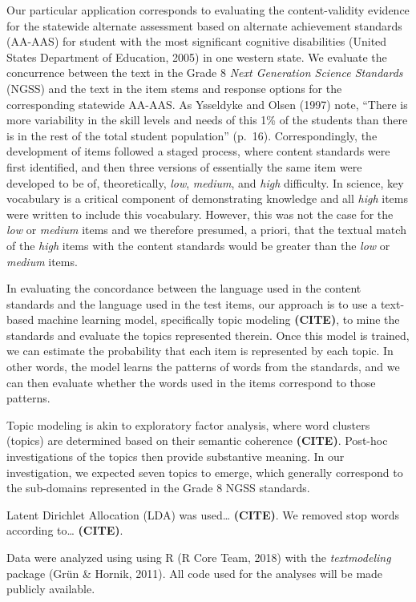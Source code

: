 \documentclass[doc]{apa6}
\theoremstyle{definition}
\theoremstyle{definition}
\theoremstyle{definition}
\theoremstyle{remark}
\begin{document}
Our particular application corresponds to evaluating the
content-validity evidence for the statewide alternate assessment based
on alternate achievement standards (AA-AAS) for student with the most
significant cognitive disabilities (United States Department of
Education, 2005) in one western state. We evaluate the concurrence
between the text in the Grade 8 \emph{Next Generation Science Standards}
(NGSS) and the text in the item stems and response options for the
corresponding statewide AA-AAS. As Ysseldyke and Olsen (1997) note,
\enquote{There is more variability in the skill levels and needs of this
1\% of the students than there is in the rest of the total student
population} (p.~16). Correspondingly, the development of items followed
a staged process, where content standards were first identified, and
then three versions of essentially the same item were developed to be
of, theoretically, \emph{low}, \emph{medium}, and \emph{high}
difficulty. In science, key vocabulary is a critical component of
demonstrating knowledge and all \emph{high} items were written to
include this vocabulary. However, this was not the case for the
\emph{low} or \emph{medium} items and we therefore presumed, a priori,
that the textual match of the \emph{high} items with the content
standards would be greater than the \emph{low} or \emph{medium} items.

In evaluating the concordance between the language used in the content
standards and the language used in the test items, our approach is to
use a text-based machine learning model, specifically topic modeling
\textbf{(CITE)}, to mine the standards and evaluate the topics
represented therein. Once this model is trained, we can estimate the
probability that each item is represented by each topic. In other words,
the model learns the patterns of words from the standards, and we can
then evaluate whether the words used in the items correspond to those
patterns.

Topic modeling is akin to exploratory factor analysis, where word
clusters (topics) are determined based on their semantic coherence
\textbf{(CITE)}. Post-hoc investigations of the topics then provide
substantive meaning. In our investigation, we expected seven topics to
emerge, which generally correspond to the sub-domains represented in the
Grade 8 NGSS standards.

Latent Dirichlet Allocation (LDA) was used\ldots{} \textbf{(CITE)}. We
removed stop words according to\ldots{} \textbf{(CITE)}.

Data were analyzed using using R (R Core Team, 2018) with the
\emph{textmodeling} package (Grün \& Hornik, 2011). All code used for
the analyses will be made publicly available.
\end{document}
